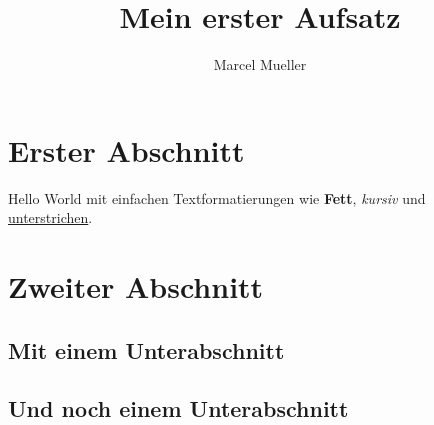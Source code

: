 \documentclass[12pt,a4paper,final]{article}
\author{Marcel Mueller}
\title{Mein erster Aufsatz}
\begin{document}
	\maketitle
	\tableofcontents
	\section{Erster Abschnitt}
	Hello World mit einfachen Textformatierungen wie \textbf{Fett}, \textit{kursiv} und \underline{unterstrichen}. 
	\section{Zweiter Abschnitt}
	\blindtext
	\subsection{Mit einem Unterabschnitt}
	\blindtext
	\subsection{Und noch einem Unterabschnitt}
	\blindtext
\end{document}
